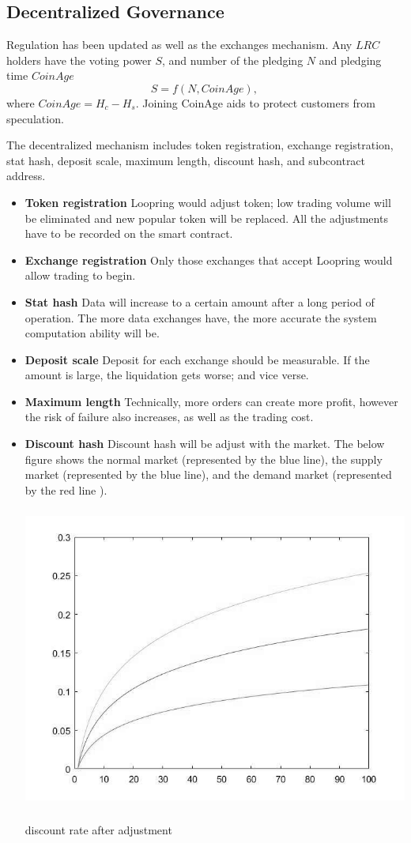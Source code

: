 \documentclass[UTF8,nofonts]{article}
\makeatletter
\newenvironment{figurehere}
 {\def\@captype{figure}}
 {}
\makeatother
\begin{document}
\subsection{Decentralized Governance}
Regulation has been updated as well as the exchanges mechanism. Any $LRC$ holders have the voting power $S$, and number of the pledging $N$ and pledging time $CoinAge$
$$S = f(N,  CoinAge)\text{, }$$
where $CoinAge = H_{c}-H_{s}$. Joining CoinAge aids to protect customers from speculation.

The decentralized mechanism includes token registration, exchange registration, stat hash, deposit scale, maximum length, discount hash, and subcontract address.
 \begin{itemize}
   \item \textbf{Token registration} Loopring would adjust token; low trading volume will be eliminated and new popular token will be replaced. All the adjustments have to be recorded on the smart contract.
  \item \textbf{Exchange registration} Only those exchanges that accept Loopring would allow trading to begin.
   \item \textbf{Stat hash} Data will increase to a certain amount after a long period of operation. The more data exchanges have, the more accurate the system computation ability will be.
  \item \textbf{Deposit scale} Deposit for each exchange should be measurable. If the amount is large, the liquidation gets worse; and vice verse.
   \item \textbf{Maximum length} Technically, more orders can create more profit, however the risk of failure also increases, as well as the trading cost.
   \item \textbf{Discount hash} Discount hash will be adjust with the market. The below figure shows the normal market (represented by the blue line), the supply market (represented by the blue line), and the demand market (represented by the red line ).
\begin{center}
\begin{figurehere}
\includegraphics[height=10cm]{images/rate_adjust.jpg}
\caption{discount rate after adjustment}
\label{fig: dischargeRateAdjust}
\end{figurehere}
\end{center}


\end{itemize}
\end{document}
